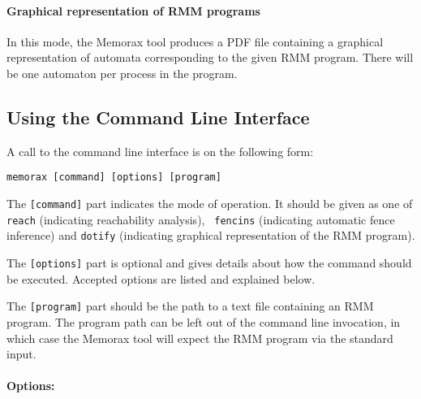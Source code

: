 \documentclass[a4paper]{article}
\newcommand{\thetool}{the Memorax tool} %
\newcommand{\binary}{memorax} %
\begin{document}
\paragraph{Graphical representation of RMM programs}
In this mode, \thetool{} produces a PDF file containing a graphical
representation of automata corresponding to the given RMM
program. There will be one automaton per process in the program. 

\subsection{Using the Command Line Interface}

A call to the command line interface is on the following form:

\vspace{15pt}

\noindent
{\tt \binary{} [command] [options] [program]}

\vspace{15pt}

The {\tt [command]} part indicates the mode of operation. It should be
given as one of {\tt reach} (indicating reachability analysis), {\tt
  fencins} (indicating automatic fence inference) and {\tt dotify}
(indicating graphical representation of the RMM program).

The {\tt [options]} part is optional and gives details about how the
command should be executed. Accepted options are listed and explained
below.

The {\tt [program]} part should be the path to a text file containing
an RMM program. The program path can be left out of the command line
invocation, in which case \thetool{} will expect the RMM program via
the standard input.

\newcommand{\explainrff}{Converting an RMM program to register free
  form, means to rewrite it such that the values of the registers are
  encoded in the control states, and all registers are replaced by the
  corresponding integer literals wherever they occur in
  instructions. This conversion is possible when all registers in the
  program have finite domains. Converting a program to register free
  form may be beneficial for analysis time, in particular when using
  the SB abstraction.}

\paragraph{Options:}
\end{document}
